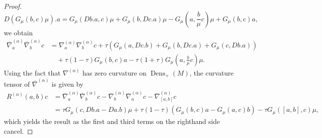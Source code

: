 \documentclass[11pt,reqno]{amsart}
\theoremstyle{definition}
\newcommand{\Dens}{\operatorname{Dens}_+(M)}
\newcommand{\GFR}{G}
\newcommand{\na}{\nabla^{(\alpha)}}
\newcommand{\nabar}{\overline{\nabla}^{(\alpha)}}
\begin{document}
\begin{proof}
$$D\left(\GFR_{\mu}(b,c)\mu\right).a=\GFR_{\mu}(Db.a,c)\mu+\GFR_{\mu}(b,Dc.a)\mu-\GFR_{\mu}\left(a,\frac{b}{\mu}c\right)\mu + \GFR_{\mu}(b,c)a,$$
we obtain
\begin{align*}      
   \nabar_a\nabar_bc&=\na_a\na_bc+\tau\left(\GFR_{\mu}(a,Dc.b)+\GFR_{\mu}(b,Dc.a)+\GFR_{\mu}(c,Db.a)\right)\\
    &\quad+\tau\left(1-\tau\right)\GFR_{\mu}(b,c)a-\tau\left(1+\tau\right)\GFR_{\mu}(a,\frac{b}{\mu}c)\mu.
\end{align*}
Using the fact that $\na$ has zero curvature on $\Dens$, the curvature tensor of $\nabar$ is given by
\begin{align*}
R^{(\alpha)}(a,b)c&=\nabar_a\nabar_bc-\nabar_b\nabar_ac-\nabar_{[a,b]}c\\
&=\tau\GFR_{\mu}(c,Db.a-Da.b)\mu+\tau\left(1-\tau\right)(\GFR_{\mu}(b,c)a-\GFR_{\mu}(a,c)b)-\tau\GFR_{\mu}([a,b],c)\mu,
\end{align*}
which yields the result as the first and third terms on the righthand side cancel.
\end{proof}
\end{document}
